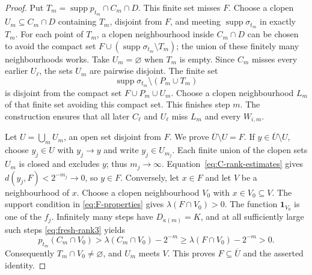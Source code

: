 \documentclass[a4paper,11pt]{amsart}
\theoremstyle{plain}
\theoremstyle{definition}
\theoremstyle{remark}
\newcommand{\supp}{\operatorname{supp}}
\newcommand{\one}{\mathbf 1}
\numberwithin{equation}{section}
\begin{document}
\begin{proof}
Put $T_m=\supp p_{t_m}\cap C_m\cap D$. This finite set misses $F$.
Choose a clopen $U_m\subseteq C_m\cap D$ containing $T_m$, disjoint from
$F$, and meeting $\supp\sigma_{t_m}$ in exactly $T_m$.
For each point of $T_m$, a clopen neighbourhood inside $C_m\cap D$
can be chosen to avoid the compact set
$F\cup(\supp\sigma_{t_m}\setminus T_m)$; the union of these finitely
many neighbourhoods works. Take $U_m=\varnothing$ when $T_m$ is empty.
Since $C_m$ misses every earlier $U_\ell$, the sets $U_m$ are pairwise
disjoint. The finite set
\[
 \supp\sigma_{t_m}\setminus(P_m\cup T_m)
\]
is disjoint from the compact set $F\cup P_m\cup U_m$. Choose a clopen
neighbourhood $L_m$ of that finite set avoiding this compact set.
This finishes step $m$. The construction ensures that all later
$C_\ell$ and $U_\ell$ miss $L_m$ and every $W_{i,m}$.


Let $U=\bigcup_mU_m$, an open set disjoint from $F$. We prove
$\overline U\setminus U=F$. If $y\in\overline U\setminus U$, choose
$y_j\in U$ with $y_j\to y$ and write $y_j\in U_{m_j}$.
Each finite union of the clopen sets $U_m$ is closed and excludes $y$;
thus $m_j\to\infty$. Equation~\eqref{eq:C-rank-estimates} gives
$d(y_j,F)<2^{-m_j}\to0$, so $y\in F$.
Conversely, let $x\in F$ and let $V$ be a neighbourhood of $x$.
Choose a clopen neighbourhood $V_0$ with $x\in V_0\subseteq V$.
The support condition in \eqref{eq:F-properties} gives
$\lambda(F\cap V_0)>0$. The function $\one_{V_0}$ is one of the $f_j$.
Infinitely many steps have $D_{\kappa(m)}=K$, and at all sufficiently
large such steps \eqref{eq:fresh-rank3} yields
\[
 p_{t_m}(C_m\cap V_0)
 >\lambda(C_m\cap V_0)-2^{-m}
 \geqslant\lambda(F\cap V_0)-2^{-m}>0.
\]
Consequently $T_m\cap V_0\neq\varnothing$, and $U_m$ meets $V$.
This proves $F\subseteq\overline U$ and the asserted identity.


\end{proof}
\end{document}
